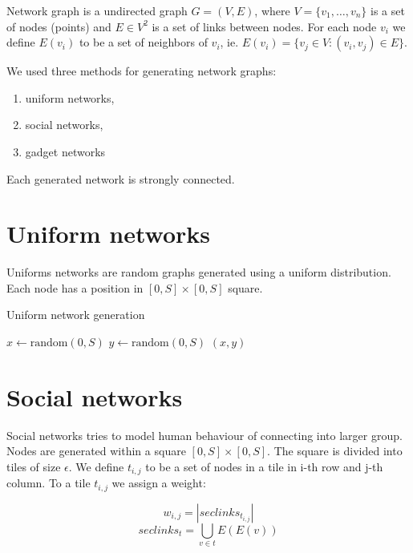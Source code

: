\documentclass[a4paper,draft,12pt]{report}
\begin{document}
Network graph is a undirected graph $G = (V, E)$, where $V = \{v_1, \ldots, v_n\}$ is a set of nodes (points) and $E \in V^2$ is a set of links between nodes. For each node $v_i$ we define $E(v_i)$ to be a set of neighbors of $v_i$, ie. $E(v_i) = \{ v_j \in V : (v_i, v_j) \in E\}$.

We used three methods for generating network graphs:
\begin{enumerate}
\item uniform networks,
\item social networks,
\item gadget networks
\end{enumerate}

\noindent Each generated network is strongly connected.

\section{Uniform networks}

Uniforms networks are random graphs generated using a uniform distribution. Each node has a position in $[0, S] \times [0, S]$ square.

\begin{algorithm}
\caption{Uniform network generation}
\label{a:uniform}
\begin{algorithmic}
	\State $x \gets \text{random}(0, S)$
	\State $y \gets \text{random}(0, S)$
	\State \Return $(x, y)$
\EndFunction
\end{algorithmic}
\end{algorithm}

\section{Social networks}

Social networks tries to model human behaviour of connecting into larger group. Nodes are generated within a square $[0, S] \times [0, S]$. The square is divided into tiles of size $\epsilon$. We define $t_{i,j}$ to be a set of nodes in a tile in i-th row and j-th column. To a tile $t_{i,j}$ we assign a weight:

\begin{equation*}
w_{i,j} = \left|seclinks_{t_{i,j}} \right|
\end{equation*}
\begin{equation*}
seclinks_t =  \bigcup_{v \in t} E(E(v))
\end{equation*}
\end{document}
